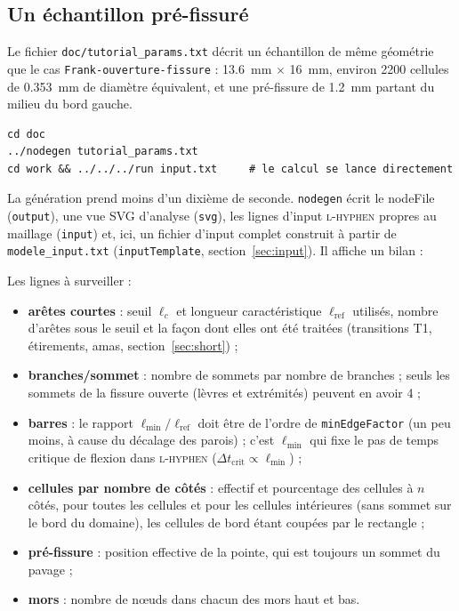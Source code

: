 \documentclass[11pt,a4paper]{article}
\newcommand{\code}[1]{\texttt{#1}}
\newcommand{\toolgen}{\code{nodegen}}
\begin{document}
\subsection{Un échantillon pré-fissuré}

Le fichier \code{doc/tutorial\_params.txt} décrit un échantillon de même géométrie que le cas
\code{Frank-ouverture-fissure} : \SI{13.6}{mm} $\times$ \SI{16}{mm}, environ 2200 cellules de
\SI{0.353}{mm} de diamètre équivalent, et une pré-fissure de \SI{1.2}{mm} partant du milieu du bord gauche.



\begin{lstlisting}
cd doc
../nodegen tutorial_params.txt
cd work && ../../../run input.txt     # le calcul se lance directement
\end{lstlisting}

La génération prend moins d'un dixième de seconde. \toolgen{} écrit le nodeFile (\code{output}), une vue SVG
d'analyse (\code{svg}), les lignes d'input \textsc{l-hyphen} propres au maillage (\code{input}) et, ici, un
fichier d'input complet construit à partir de \code{modele\_input.txt} (\code{inputTemplate},
section~\ref{sec:input}). Il affiche un bilan :



Les lignes à surveiller :
\begin{itemize}[nosep]
  \item \textbf{arêtes courtes} : seuil $\ell_c$ et longueur caractéristique $\ell_{\text{ref}}$ utilisés, nombre
    d'arêtes sous le seuil et la façon dont elles ont été traitées (transitions T1, étirements, amas,
    section~\ref{sec:short}) ;
  \item \textbf{branches/sommet} : nombre de sommets par nombre de branches ; seuls les sommets de la fissure
    ouverte (lèvres et extrémités) peuvent en avoir 4 ;
  \item \textbf{barres} : le rapport $\ell_{\min}/\ell_{\text{ref}}$ doit être de l'ordre de \code{minEdgeFactor}
    (un peu moins, à cause du décalage des parois) ; c'est $\ell_{\min}$ qui fixe le pas de temps critique de
    flexion dans \textsc{l-hyphen} ($\Delta t_{\text{crit}}\propto\ell_{\min}$) ;
  \item \textbf{cellules par nombre de côtés} : effectif et pourcentage des cellules à $n$ côtés, pour toutes les
    cellules et pour les cellules intérieures (sans sommet sur le bord du domaine), les cellules de bord étant
    coupées par le rectangle ;
  \item \textbf{pré-fissure} : position effective de la pointe, qui est toujours un sommet du pavage ;
  \item \textbf{mors} : nombre de nœuds dans chacun des mors haut et bas.
\end{itemize}
\end{document}
